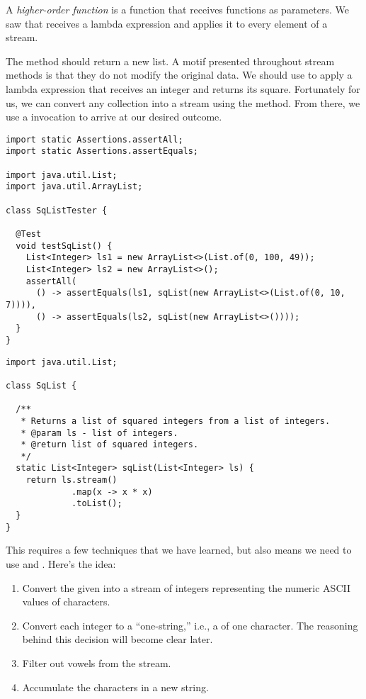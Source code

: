 A \emph{higher-order function} is a function that receives functions as parameters. 
We saw that  receives a lambda expression and applies it to every element of a stream. 

The method should return a new list. 
A motif presented throughout stream methods is that they do not modify the original data. 
We should use  to apply a lambda expression that receives an integer and returns its square. 
Fortunately for us, we can convert any collection into a stream using the  method. 
From there, we use a  invocation to arrive at our desired outcome.


\begin{lstlisting}[language=MyJava]
import static Assertions.assertAll;
import static Assertions.assertEquals;

import java.util.List;
import java.util.ArrayList;

class SqListTester {

  @Test
  void testSqList() {
    List<Integer> ls1 = new ArrayList<>(List.of(0, 100, 49));
    List<Integer> ls2 = new ArrayList<>();
    assertAll(
      () -> assertEquals(ls1, sqList(new ArrayList<>(List.of(0, 10, 7)))),
      () -> assertEquals(ls2, sqList(new ArrayList<>())));
  }
}
\end{lstlisting}    

\begin{lstlisting}[language=MyJava]
import java.util.List;

class SqList {

  /**
   * Returns a list of squared integers from a list of integers.
   * @param ls - list of integers.
   * @return list of squared integers.
   */
  static List<Integer> sqList(List<Integer> ls) {
    return ls.stream()
             .map(x -> x * x)
             .toList();
  }
}
\end{lstlisting}    

This requires a few techniques that we have learned, but also means we need to use  and . Here's the idea:

\begin{enumerate}
    \item Convert the given  into a stream of integers representing the numeric ASCII values of characters.
    \item Convert each integer to a ``one-string,'' i.e., a  of one character. The reasoning behind this decision will become clear later.
    \item Filter out vowels from the stream.
    \item Accumulate the characters in a new string.
\end{enumerate}

